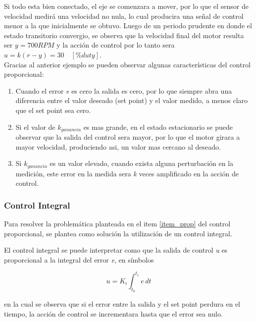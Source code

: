 \documentclass[10pt,conference,a4paper,onecolumn]{article}%
\begin{document}
 Si todo esta bien conectado, el eje se comenzara a mover, por lo que el sensor de velocidad medirá una velocidad no nula, lo cual producira una señal de control menor a la que inicialmente se obtuvo. Luego de un periodo prudente en donde el estado transitorio convergio, se observa que la velocidad final del motor resulta ser $y=700RPM$ y la acción de control por lo tanto sera $u=k(r-y)=30\quad [\%duty]$. \\
 
 
 Gracias al anterior ejemplo se pueden observar algunas características del control proporcional:
 \begin{enumerate}
 \item \label{item_prop} Cuando el error \textit{e} es cero la salida es cero, por lo que siempre abra una diferencia entre el valor deseado (set point) y el valor medido, a menos claro que el set point sea cero.
 \item Si el valor de $k_{ganancia}$ es mas grande, en el estado estacionario se puede observar que la salida del control sera mayor, por lo que el motor girara a mayor velocidad, produciendo asi, un valor mas cercano al deseado.
 \item Si $k_{ganancia}$ es un valor elevado, cuando exista alguna perturbación en la medición, este error en la medida sera \textit{k} veces amplificado en la acción de control. 
 \end{enumerate}
 
 
 \subsubsection{Control Integral}

Para resolver la problemática planteada en el item \ref{item_prop} del control proporcional, se plantea como solución la utilización de un control integral. 

El control integral se puede interpretar como que la salida de control \textit{u} es proporcional a la integral del error \textit{e}, en símbolos


\begin{equation}
u=K_i \int_{t_0}^{t_1} e \,dt 
\label{eq:control_integral}
\end{equation}


en la cual se observa que si el error entre la salida y el set point perdura en el tiempo, la acción de control se incrementara hasta que el error sea nulo.
\end{document}
